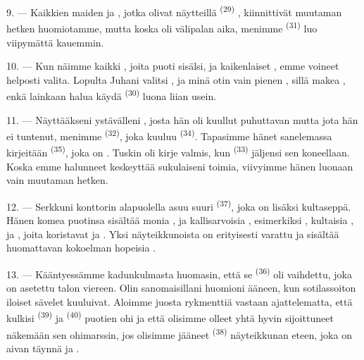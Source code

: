 \VUsaut{3.0mm}

9. --- Kaikkien maiden  ja , jotka olivat
näytteillä  \textsuperscript{(29)}
, kiinnittivät muutaman hetken huomiotamme, mutta koska
oli välipalan aika, menimme  \textsuperscript{(31)} luo
viipymättä kauemmin.

10. --- Kun näimme kaikki , joita puoti sisälsi,  ja kaikenlaiset , emme voineet
helposti valita. Lopulta Juhani valitsi , ja minä otin vain
pienen , sillä makea , enkä
lainkaan halua käydä  \textsuperscript{(30)} luona
liian usein.

\VUsaut{3.0mm}

11. --- Näyttääkseni ystävälleni , josta hän oli kuullut
puhuttavan mutta jota hän ei tuntenut, menimme 
\textsuperscript{(32)}, joka kuuluu  \textsuperscript{(34)}.
Tapasimme hänet sanelemassa kirjeitään 
\textsuperscript{(35)}, joka on . Tuskin oli kirje
valmis, kun  \textsuperscript{(33)} jäljensi sen
koneellaan. Koska emme halunneet keskeyttää sukulaiseni toimia, viivyimme hänen
luonaan vain muutaman hetken.

12. --- Serkkuni konttorin alapuolella asuu suuri 
\textsuperscript{(37)}, joka on lisäksi kultaseppä. Hänen komea puotinsa
sisältää monia ,
 ja kallisarvoisia , esimerkiksi
, kultaisia ,
 ja , joita koristavat
 ja . Yksi näyteikkunoista on erityisesti
varattu  ja sisältää huomattavan kokoelman hopeisia
.

13. --- Kääntyessämme kadunkulmasta huomasin, että se 
\textsuperscript{(36)} oli vaihdettu, joka on asetettu talon 
viereen. Olin sanomaisillani huomioni ääneen, kun  sotilassoiton
iloiset sävelet kuuluivat. Aloimme juosta rykmenttiä vastaan ajattelematta, että
 kulkisi  \textsuperscript{(39)} ja
 \textsuperscript{(40)} puotien ohi ja että olisimme
olleet yhtä hyvin sijoittuneet näkemään sen ohimarssin, jos olisimme jääneet
 \textsuperscript{(38)} näyteikkunan eteen, joka on aivan täynnä
 ja .

